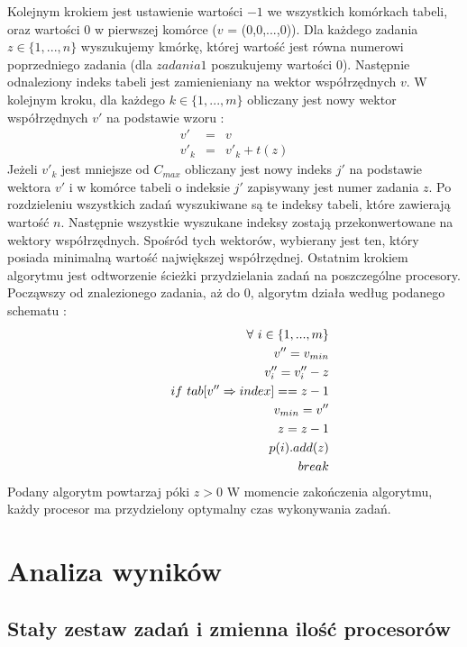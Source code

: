 \documentclass[wide,a4paper,titlepage,12pt] {article}
\begin{document}
  Kolejnym krokiem jest ustawienie wartości $-1$ we wszystkich komórkach tabeli, oraz wartości $0$ w pierwszej komórce ($v$ = (0,0,...,0)). Dla każdego zadania $z \in \{1,...,n\}$ wyszukujemy kmórkę, której wartość jest równa numerowi poprzedniego zadania (dla $zadania 1$ poszukujemy wartości $0$). Następnie odnaleziony indeks tabeli jest zamienieniany na wektor współrzędnych $v$. W kolejnym kroku, dla każdego $k \in \{1,...,m\}$ obliczany jest nowy wektor współrzędnych $v'$ na podstawie wzoru :
  \begin{eqnarray*}
    v' &=& v\\
    v'_k &=& v'_k + t(z) 
  \end{eqnarray*}
   Jeżeli $v'_k$ jest mniejsze od $C_{max}$ obliczany jest nowy indeks $j'$ na podstawie wektora $v'$ i w komórce tabeli o indeksie $j'$ zapisywany jest numer zadania $z$.
  \newline\newline
  Po rozdzieleniu wszystkich zadań wyszukiwane są te indeksy tabeli, które zawierają wartość $n$. Następnie wszystkie wyszukane indeksy zostają przekonwertowane na wektory współrzędnych. Spośród tych wektorów, wybierany jest ten, który posiada minimalną wartość największej współrzędnej. Ostatnim krokiem algorytmu jest odtworzenie ścieżki przydzielania zadań na poszczególne procesory. Począwszy od znalezionego zadania, aż do $0$, algorytm działa według podanego schematu :
   \begin{eqnarray*}
      &&\forall \ i \in \{1,...,m\} \\
      &&\indent v'' = v_{min} \\
      &&\indent v''_{i} = v''_{i} - z \\
      &&\indent if \ tab[v'' \Rightarrow index] == z-1\\
      &&\indent\indent v_{min} = v'' \\
      &&\indent\indent z = z-1 \\
      &&\indent\indent p(i).add(z) \\
      &&\indent break
    \end{eqnarray*}
     Podany algorytm powtarzaj póki $z>0$\newline\newline
     W momencie zakończenia algorytmu, każdy procesor ma przydzielony optymalny czas wykonywania zadań.
    \section{Analiza wyników}
    \subsection{Stały zestaw zadań i zmienna ilość procesorów}
\end{document}
